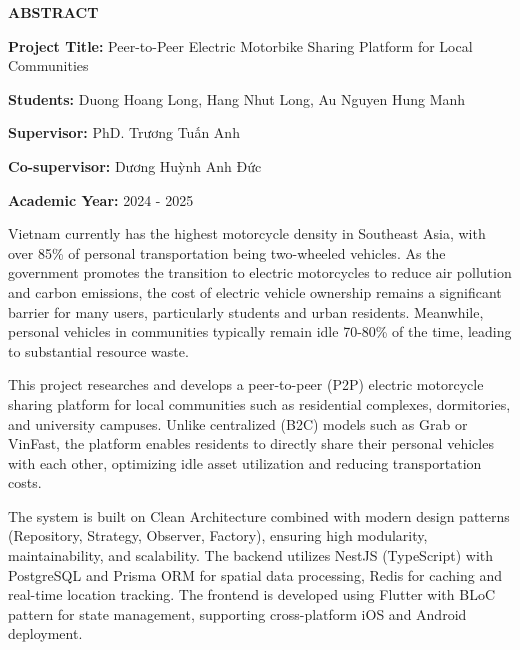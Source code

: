 


\newpage
\thispagestyle{empty}
\begin{center}
    \textbf{\Large ABSTRACT}
\end{center}

\vspace{0.5cm}

\noindent\textbf{Project Title:} Peer-to-Peer Electric Motorbike Sharing Platform for Local Communities

\noindent\textbf{Students:} Duong Hoang Long, Hang Nhut Long, Au Nguyen Hung Manh

\noindent\textbf{Supervisor:} PhD. Trương Tuấn Anh

\noindent\textbf{Co-supervisor:} Dương Huỳnh Anh Đức

\noindent\textbf{Academic Year:} 2024 - 2025

\vspace{0.5cm}

Vietnam currently has the highest motorcycle density in Southeast Asia, with over 85\% of personal transportation being two-wheeled vehicles. As the government promotes the transition to electric motorcycles to reduce air pollution and carbon emissions, the cost of electric vehicle ownership remains a significant barrier for many users, particularly students and urban residents. Meanwhile, personal vehicles in communities typically remain idle 70-80\% of the time, leading to substantial resource waste.

This project researches and develops a peer-to-peer (P2P) electric motorcycle sharing platform for local communities such as residential complexes, dormitories, and university campuses. Unlike centralized (B2C) models such as Grab or VinFast, the platform enables residents to directly share their personal vehicles with each other, optimizing idle asset utilization and reducing transportation costs.

The system is built on Clean Architecture combined with modern design patterns (Repository, Strategy, Observer, Factory), ensuring high modularity, maintainability, and scalability. 
The backend utilizes NestJS (TypeScript) with PostgreSQL and Prisma ORM for spatial data processing, Redis for caching and real-time location tracking. The frontend is developed using Flutter with BLoC pattern for state management, supporting cross-platform iOS and Android deployment.

